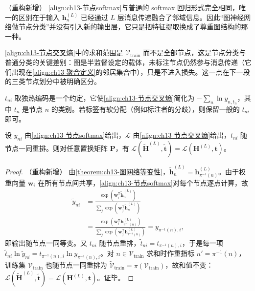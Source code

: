 \documentclass[../../main.tex]{subfiles}
\begin{document}
\begin{remark}（重构新增）
\eqref{align:ch13-节点softmax}与普通的 softmax 回归形式完全相同，唯一的区别在于输入 $\bm{h}_n^{(L)}$ 已经通过 $L$ 层消息传递融合了邻域信息。因此“图神经网络做节点分类”并没有引入新的输出层，它只是把特征提取换成了尊重图结构的那一种。\par
\eqref{align:ch13-节点交叉熵}中的求和范围是 $\mathcal{V}_{\mathrm{train}}$ 而不是全部节点，这是节点分类与普通分类的关键差别：图是半监督设定的载体，未标注节点仍然参与消息传递（它们出现在\eqref{align:ch13-聚合定义}的邻居集合中），只是不进入损失。这一点在下一段的三类节点划分中被明确区分。\par
$t_{ni}$ 取独热编码是一个约定，它使\eqref{align:ch13-节点交叉熵}简化为 $-\sum_{n}\ln y_{n,t_n}$，其中 $t_n$ 是节点 $n$ 的类别。若标签有软分配（例如标注者的分歧），则保留一般的 $t_{ni}$ 即可。
\end{remark}

\begin{proposition}[节点分类损失的置换不变性]\label{proposition:ch13-节点分类损失不变性}
设 $y_{ni}$ 由\eqref{align:ch13-节点softmax}给出，$\mathcal{L}$ 由\eqref{align:ch13-节点交叉熵}给出，$t_{ni}$ 随节点一同重排。则对任意置换矩阵 $\bm{P}$，有 $\mathcal{L}(\widetilde{\bm{H}}^{(L)},\widetilde{\bm{t}})=\mathcal{L}(\bm{H}^{(L)},\bm{t})$。
\end{proposition}

\begin{proof}（重构新增）
由\cref{theorem:ch13-图网络等变性}，$\widetilde{\bm{h}}_n^{(L)}=\bm{h}_{\pi^{-1}(n)}^{(L)}$。由于权重向量 $\bm{w}_i$ 在所有节点间共享，\eqref{align:ch13-节点softmax}对每个节点逐点计算，故
\begin{align*}
\widetilde{y}_{ni}&=\frac{\exp(\bm{w}_i^{\mathsf T}\widetilde{\bm{h}}_n^{(L)})}{\sum_j\exp(\bm{w}_j^{\mathsf T}\widetilde{\bm{h}}_n^{(L)})}\\
&=\frac{\exp(\bm{w}_i^{\mathsf T}\bm{h}_{\pi^{-1}(n)}^{(L)})}{\sum_j\exp(\bm{w}_j^{\mathsf T}\bm{h}_{\pi^{-1}(n)}^{(L)})}=y_{\pi^{-1}(n),i},
\end{align*}
即输出随节点一同等变。又 $t_{ni}$ 随节点重排，$\widetilde{t}_{ni}=t_{\pi^{-1}(n),i}$，于是每一项 $\widetilde{t}_{ni}\ln\widetilde{y}_{ni}=t_{\pi^{-1}(n),i}\ln y_{\pi^{-1}(n),i}$。对 $n\in\mathcal{V}_{\mathrm{train}}$ 求和时作重指标 $n'=\pi^{-1}(n)$，训练集 $\mathcal{V}_{\mathrm{train}}$ 也随节点一同重排为 $\widetilde{\mathcal{V}}_{\mathrm{train}}=\pi(\mathcal{V}_{\mathrm{train}})$，故和值不变：$\mathcal{L}(\widetilde{\bm{H}}^{(L)},\widetilde{\bm{t}})=\mathcal{L}(\bm{H}^{(L)},\bm{t})$。证毕。
\end{proof}
\end{document}
